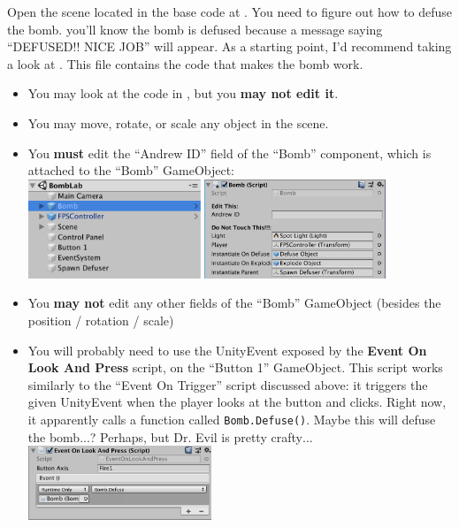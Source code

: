 \documentclass[11pt]{article}
\begin{document}
Open the scene located in the base code at .  You need to figure 
out how to defuse the bomb.  you'll know the bomb is defused because a message saying 
``DEFUSED!! NICE JOB'' will appear.  As a starting point, I'd recommend taking a look at 
.  This file contains the code that makes the bomb work.
\begin{itemize}
    \setlength\itemsep{0.25em}
    \item You may look at the code in , but you \textbf{may not edit it}.
    \item You may move, rotate, or scale any object in the scene.
    \item You \textbf{must} edit the ``Andrew ID'' field of the ``Bomb'' component, which is attached
          to the ``Bomb'' GameObject: \\ 
          \includegraphics[height=8em]{bomblab-2} \includegraphics[height=8em]{bomblab-3}
    \item You \textbf{may not} edit any other fields of the ``Bomb'' GameObject (besides the position /
          rotation / scale)
    \item You will probably need to use the UnityEvent exposed by the \textbf{Event On Look And Press}
          script, on the ``Button 1'' GameObject.  This script works similarly to the ``Event On Trigger''
          script discussed above: it triggers the given UnityEvent when the player looks at the button
          and clicks.  Right now, it apparently calls a function called \lstinline|Bomb.Defuse()|.
          Maybe this will defuse the bomb...?  Perhaps, but Dr. Evil is pretty crafty$\dots$\\
          \includegraphics[height=6em]{bomblab-4}
\end{itemize}
\end{document}
